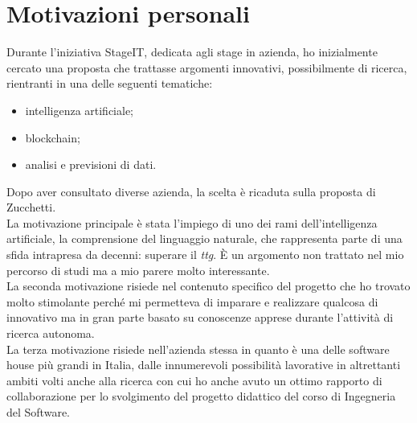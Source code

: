 \section{Motivazioni personali}
Durante l'iniziativa StageIT, dedicata agli stage in azienda, ho inizialmente cercato una proposta che trattasse argomenti innovativi, possibilmente di ricerca, rientranti in una delle seguenti tematiche:
\begin{itemize}
	\item intelligenza artificiale;
	\item blockchain;
	\item analisi e previsioni di dati.
\end{itemize}
Dopo aver consultato diverse azienda, la scelta è ricaduta sulla proposta di Zucchetti. \\
La motivazione principale è stata l'impiego di uno dei rami dell'intelligenza artificiale, la comprensione del linguaggio naturale, che rappresenta parte di una sfida intrapresa da decenni: superare il \emph{\gls{ttg}}\glsfirstoccur. È un argomento non trattato nel mio percorso di studi ma a mio parere molto interessante. \\
La seconda motivazione risiede nel contenuto specifico del progetto che ho trovato molto stimolante perché mi permetteva di imparare e realizzare qualcosa di innovativo ma in gran parte basato su conoscenze apprese durante l'attività di ricerca autonoma. \\
La terza motivazione risiede nell'azienda stessa in quanto è una delle software house più grandi in Italia, dalle innumerevoli possibilità lavorative in altrettanti ambiti volti anche alla ricerca con cui ho anche avuto un ottimo rapporto di collaborazione per lo svolgimento del progetto didattico del corso di Ingegneria del Software.